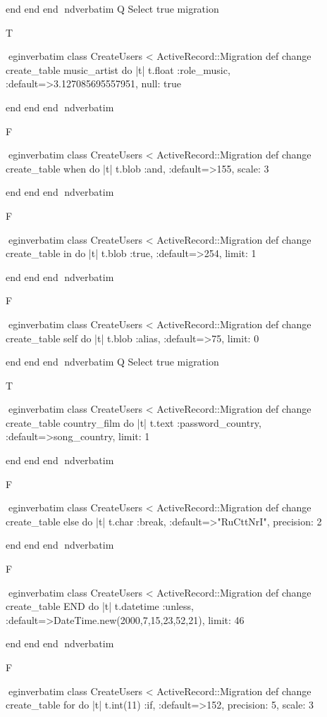     end 
  end 
end
nd{verbatim}
Q
 Select true migration

T

egin{verbatim}
 class CreateUsers < ActiveRecord::Migration 
  def change 
    create_table music_artist do |t| 
      t.float :role_music, :default=>3.127085695557951, null: true
    
    end 
  end 
end
nd{verbatim}

F

egin{verbatim}
 class CreateUsers < ActiveRecord::Migration 
  def change 
    create_table when do |t| 
      t.blob :and, :default=>155, scale: 3
    
    end 
  end 
end
nd{verbatim}

F

egin{verbatim}
 class CreateUsers < ActiveRecord::Migration 
  def change 
    create_table in do |t| 
      t.blob :true, :default=>254, limit: 1
    
    end 
  end 
end
nd{verbatim}

F

egin{verbatim}
 class CreateUsers < ActiveRecord::Migration 
  def change 
    create_table self do |t| 
      t.blob :alias, :default=>75, limit: 0
    
    end 
  end 
end
nd{verbatim}
Q
 Select true migration

T

egin{verbatim}
 class CreateUsers < ActiveRecord::Migration 
  def change 
    create_table country_film do |t| 
      t.text :password_country, :default=>song_country, limit: 1
    
    end 
  end 
end
nd{verbatim}

F

egin{verbatim}
 class CreateUsers < ActiveRecord::Migration 
  def change 
    create_table else do |t| 
      t.char :break, :default=>"RuCttNrI", precision: 2
    
    end 
  end 
end
nd{verbatim}

F

egin{verbatim}
 class CreateUsers < ActiveRecord::Migration 
  def change 
    create_table END do |t| 
      t.datetime :unless, :default=>DateTime.new(2000,7,15,23,52,21), limit: 46
    
    end 
  end 
end
nd{verbatim}

F

egin{verbatim}
 class CreateUsers < ActiveRecord::Migration 
  def change 
    create_table for do |t| 
      t.int(11) :if, :default=>152, precision: 5, scale: 3
    
